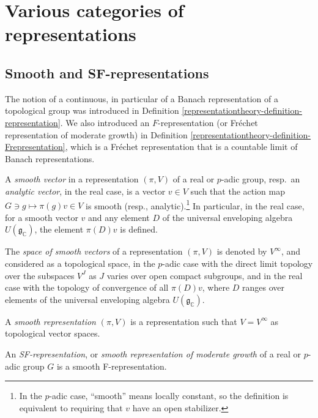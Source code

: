 \section{Various categories of representations}
\label{section-categories-representations}

\subsection{Smooth and SF-representations}
\label{subsection-smooth-SF-representations}


The notion of a continuous, in particular of a Banach representation of a topological group was introduced in Definition \ref{representationtheory-definition-representation}. We also introduced an $F$-representation (or Fr\'echet representation of moderate growth) in Definition \ref{representationtheory-definition-Frepresentation}, which is a Fr\'echet representation that is a countable limit of Banach representations. 

\begin{definition}
 \label{definition-smooth-representation}
A {\it smooth vector} in a representation $(\pi, V)$ of a real or $p$-adic group, resp.\ an {\it analytic vector}, in the real case, is a vector $v\in V$ such that the action map $G\ni g \mapsto \pi(g) v \in V$ is smooth (resp., analytic).\footnote{In the $p$-adic case, ``smooth'' means locally constant, so the definition is equivalent to requiring that $v$ have an open stabilizer.} In particular, in the real case, for a smooth vector $v$ and any element $D$ of the universal enveloping algebra $U(\mathfrak g_{\mathbb C})$, the element $\pi(D) v$ is defined.

The {\it space of smooth vectors} of a representation $(\pi, V)$ is denoted by $V^\infty$, and considered as a topological space, in the $p$-adic case with the direct limit topology over the subspaces $V^J$ as $J$ varies over open compact subgroups, and in the real case with the topology of convergence of all $\pi(D)v$, where $D$ ranges over elements of the universal enveloping algebra $U(\mathfrak g_{\mathbb C})$. 
 
A {\it smooth representation} $(\pi, V)$ is a representation such that $V = V^\infty$ as topological vector spaces. 

An {\it SF-representation}, or {\it smooth representation of moderate growth} of a real or $p$-adic group $G$ is a smooth F-representation. 
\end{definition}

